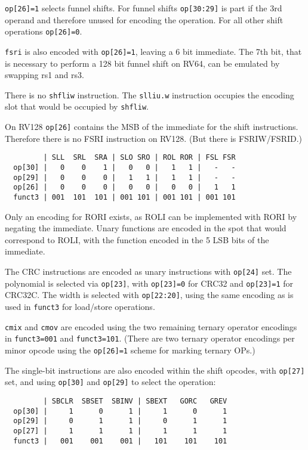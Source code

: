 {\tt op[26]=1} selects funnel shifts. For funnel shifts {\tt op[30:29]} is part
if the 3rd operand and therefore unused for encoding the operation. For all other
shift operations {\tt op[26]=0}.

{\tt fsri} is also encoded with {\tt op[26]=1}, leaving a 6 bit immediate. The 7th
bit, that is necessary to perform a 128 bit funnel shift on RV64, can be
emulated by swapping rs1 and rs3.

There is no {\tt shfliw} instruction. The {\tt slliu.w} instruction occupies
the encoding slot that would be occupied by {\tt shfliw}.

On RV128 {\tt op[26]} contains the MSB of the immediate for the shift instructions.
Therefore there is no FSRI instruction on RV128. (But there is FSRIW/FSRID.)

\begin{minipage}{\linewidth}
\begin{verbatim}
         | SLL  SRL  SRA | SLO SRO | ROL ROR | FSL FSR
  op[30] |   0    0    1 |   0   0 |   1   1 |   -   -
  op[29] |   0    0    0 |   1   1 |   1   1 |   -   -
  op[26] |   0    0    0 |   0   0 |   0   0 |   1   1
  funct3 | 001  101  101 | 001 101 | 001 101 | 001 101
\end{verbatim}
\end{minipage}

Only an encoding for RORI exists, as ROLI can be implemented with RORI by negating
the immediate. Unary functions are encoded in the spot that would correspond to ROLI,
with the function encoded in the 5 LSB bits of the immediate.

The CRC instructions are encoded as unary instructions with {\tt op[24]} set. The
polynomial is selected via {\tt op[23]}, with {\tt op[23]=0} for CRC32 and
{\tt op[23]=1} for CRC32C. The width is selected with {\tt op[22:20]}, using
the same encoding as is used in {\tt funct3} for load/store operations.

{\tt cmix} and {\tt cmov} are encoded using the two remaining ternary operator
encodings in {\tt funct3=001} and {\tt funct3=101}. (There are two ternary
operator encodings per minor opcode using the {\tt op[26]=1} scheme for
marking ternary OPs.)

The single-bit instructions are also encoded within the shift opcodes, with
{\tt op[27]} set, and using {\tt op[30]} and {\tt op[29]} to select the operation:

\begin{minipage}{\linewidth}
\begin{verbatim}
         | SBCLR  SBSET  SBINV | SBEXT   GORC   GREV
  op[30] |     1      0      1 |     1      0      1
  op[29] |     0      1      1 |     0      1      1
  op[27] |     1      1      1 |     1      1      1
  funct3 |   001    001    001 |   101    101    101
\end{verbatim}
\end{minipage}


